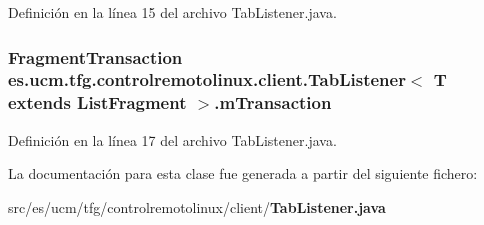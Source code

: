 Definición en la línea 15 del archivo Tab\-Listener.\-java.

\subsubsection[{m\-Transaction}]{\setlength{\rightskip}{0pt plus 5cm}Fragment\-Transaction es.\-ucm.\-tfg.\-controlremotolinux.\-client.\-Tab\-Listener$<$ T extends List\-Fragment $>$.m\-Transaction\hspace{0.3cm}{\ttfamily [private]}}\label{classes_1_1ucm_1_1tfg_1_1controlremotolinux_1_1client_1_1TabListener_3_01T_01extends_01ListFragment_01_4_a18b6c099df442768ca7dfe4f07fdabab}


Definición en la línea 17 del archivo Tab\-Listener.\-java.



La documentación para esta clase fue generada a partir del siguiente fichero\-:\begin{DoxyCompactItemize}
\item 
src/es/ucm/tfg/controlremotolinux/client/{\bf Tab\-Listener.\-java}\end{DoxyCompactItemize}
